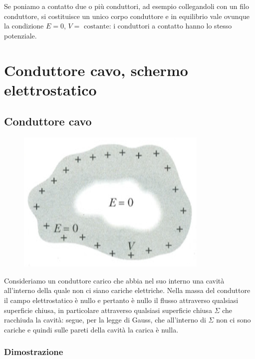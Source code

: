 \documentclass[class=book, crop=false, oneside, 12pt]{standalone}
\begin{document}
Se poniamo a contatto due o più conduttori, ad esempio collegandoli con un filo conduttore, si costituisce un unico corpo conduttore e in equilibrio vale ovunque la condizione \(E = 0\), \(V =\text{ costante}\): i conduttori a contatto hanno lo stesso potenziale. 

\section{Conduttore cavo, schermo elettrostatico}

\subsection{Conduttore cavo}

\begin{figure}[h]
    \includegraphics[scale=0.4]{conduttore_cavo.png}
    \centering
    \caption{}
\end{figure}

Consideriamo un conduttore carico che abbia nel suo interno una cavità all'interno della quale non ci siano cariche elettriche. 
Nella massa del conduttore il campo elettrostatico è nullo e pertanto è nullo il flusso attraverso qualsiasi superficie chiusa, in particolare attraverso qualsiasi superficie chiusa \(\Sigma\) che racchiuda la cavità: segue, per la legge di Gauss, che all'interno di \(\Sigma\) non ci sono cariche e quindi sulle pareti della cavità la carica è nulla.

\subsubsection{Dimostrazione}
\end{document}
